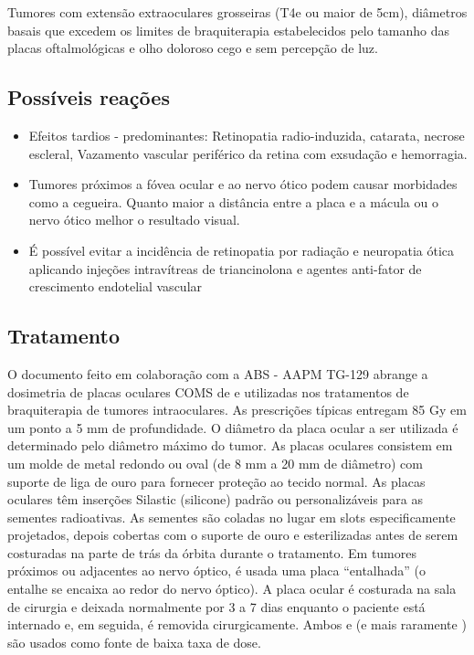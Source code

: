 \documentclass[11pt,a4paper]{article}
\begin{document}
    Tumores com extensão extraoculares grosseiras (T4e ou maior de 5cm), diâmetros basais que excedem os limites de braquiterapia estabelecidos pelo tamanho das placas oftalmológicas e olho doloroso cego e sem percepção de luz.

\subsection*{Possíveis reações}


    \begin{itemize}
        \item Efeitos tardios - predominantes: Retinopatia radio-induzida, catarata, necrose escleral, Vazamento vascular periférico da retina com exsudação e hemorragia.
        \item Tumores próximos a fóvea ocular e ao nervo ótico podem causar morbidades como a cegueira. Quanto maior a distância entre a placa e a mácula ou o nervo ótico melhor o resultado visual.
        \item É possível evitar a incidência de retinopatia por radiação e neuropatia ótica aplicando injeções intravítreas de triancinolona e agentes anti-fator de crescimento endotelial vascular
    \end{itemize}

\subsection*{Tratamento}

    O documento feito em colaboração com a ABS - AAPM TG-129 abrange a dosimetria de placas oculares COMS de  e  utilizadas nos tratamentos de braquiterapia de tumores intraoculares. As prescrições típicas entregam 85 Gy em um ponto a 5 mm de profundidade. O diâmetro da placa ocular a ser utilizada é determinado pelo diâmetro máximo do tumor. As placas oculares consistem em um molde de metal redondo ou oval (de 8 mm a 20 mm de diâmetro) com suporte de liga de ouro para fornecer proteção ao tecido normal. As placas oculares têm inserções Silastic (silicone) padrão ou personalizáveis para as sementes radioativas. As sementes são coladas no lugar em slots especificamente projetados, depois cobertas com o suporte de ouro e esterilizadas antes de serem costuradas na parte de trás da órbita durante o tratamento. Em tumores próximos ou adjacentes ao nervo óptico, é usada uma placa “entalhada” (o entalhe se encaixa ao redor do nervo óptico). A placa ocular é costurada na sala de cirurgia e deixada normalmente por 3 a 7 dias enquanto o paciente está internado e, em seguida, é removida cirurgicamente. Ambos  e  (e mais raramente ) são usados como fonte de baixa taxa de dose.
\end{document}
